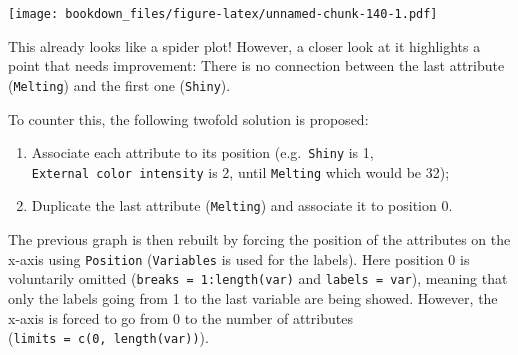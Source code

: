 \documentclass[
]{krantz}
\makeatletter
\newenvironment{Shaded}{\begin{snugshade}}{\end{snugshade}}
\newcommand{\AttributeTok}[1]{\textcolor[rgb]{0.61,0.61,0.61}{#1}}
\newcommand{\DecValTok}[1]{\textcolor[rgb]{0.06,0.06,0.06}{#1}}
\newcommand{\FunctionTok}[1]{\textcolor[rgb]{0,0,0}{#1}}
\newcommand{\NormalTok}[1]{#1}
\newcommand{\OtherTok}[1]{\textcolor[rgb]{0.37,0.37,0.37}{#1}}
\newcommand{\SpecialCharTok}[1]{\textcolor[rgb]{0,0,0}{#1}}
\newcommand{\StringTok}[1]{\textcolor[rgb]{0.5,0.5,0.5}{#1}}
\providecommand{\tightlist}{%
  \setlength{\itemsep}{0pt}\setlength{\parskip}{0pt}}
\newenvironment{kframe}{%
\medskip{}
\setlength{\fboxsep}{.8em}
 \def\at@end@of@kframe{}%
 \ifinner\ifhmode%
  \def\at@end@of@kframe{\end{minipage}}%
  \begin{minipage}{\columnwidth}%
 \fi\fi%
 \def\FrameCommand##1{\hskip\@totalleftmargin \hskip-\fboxsep
 \colorbox{shadecolor}{##1}\hskip-\fboxsep
     \hskip-\linewidth \hskip-\@totalleftmargin \hskip\columnwidth}%
 \MakeFramed {\advance\hsize-\width
   \@totalleftmargin\z@ \linewidth\hsize
   \@setminipage}}%
 {\par\unskip\endMakeFramed%
 \at@end@of@kframe}
\renewenvironment{Shaded}{\begin{kframe}}{\end{kframe}}
\makeatother
\begin{document}
\texttt{[image: bookdown\_files/figure-latex/unnamed-chunk-140-1.pdf]}

This already looks like a spider plot! However, a closer look at it highlights a point that needs improvement: There is no connection between the last attribute (\texttt{Melting}) and the first one (\texttt{Shiny}).

To counter this, the following twofold solution is proposed:

\begin{enumerate}
\def\labelenumi{\arabic{enumi}.}
\tightlist
\item
  Associate each attribute to its position (e.g.~\texttt{Shiny} is 1, \texttt{External\ color\ intensity} is 2, until \texttt{Melting} which would be 32);
\item
  Duplicate the last attribute (\texttt{Melting}) and associate it to position 0.
\end{enumerate}

\begin{Shaded}
\end{Shaded}

The previous graph is then rebuilt by forcing the position of the attributes on the x-axis using \texttt{Position} (\texttt{Variables} is used for the labels). Here position 0 is voluntarily omitted (\texttt{breaks\ =\ 1:length(var)} and \texttt{labels\ =\ var}), meaning that only the labels going from 1 to the last variable are being showed. However, the x-axis is forced to go from 0 to the number of attributes (\texttt{limits\ =\ c(0,\ length(var))}).
\end{document}
